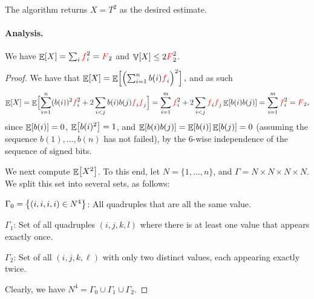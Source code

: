 The algorithm returns $X = T^2$ as the desired estimate.

\paragraph*{Analysis.}
\begin{lemma}
    We have $\mathop{\mathbb{E}}\!\left[ {X} \right] = \sum_i {\textcolor{red}{f}}_i^2 = {\textcolor{red}{F}}_2$ and
    $\mathop{\mathbb{V}}\!\left[ {X} \right] \leq 2 {\textcolor{red}{F}}_2^2$.
\end{lemma}
\begin{proof}
    We have that
    \begin{math}
        \Ex{X}
        =
        \Ex{\smash{ \Bigl(  \sum_{i=1}^n b(i) \frq_i \Bigr)^2}
           \Bigr.},%
    \end{math}
    and as such
    \begin{equation*}
        \Ex{X}%
        =%
        \Ex{\Bigr. \smash{  \sum_{i=1}^n (b(i))^2 \frq_i^2 %
              + 2\sum_{i < j} b(i) b(j) \frq_i \frq_j}}%
        =%
        \sum_{i=1}^m  \frq_i^2 +  2\sum_{i < j}  \frq_i \frq_j \Ex{   %
           b(i) b(j)}%
        =%
        \sum_{i=1}^m  \frq_i^2
        =%
        \Frq_2,
    \end{equation*}
    since $\mathop{\mathbb{E}}\!\left[ {b(i)} \right] = 0$, $\mathop{\mathbb{E}}\!\left[ {b(i)^2} \right] =1$, and
    $\mathop{\mathbb{E}}\!\left[ {b(i)b(j) } \right] = \mathop{\mathbb{E}}\!\left[ {b(i) } \right] \mathop{\mathbb{E}}\!\left[ {b(j)} \right] = 0$ (assuming the sequence
    $b(1), \ldots, b(n)$ has not failed), by the $6$-wise independence
    of the sequence of signed bits.

    \medskip%
    We next compute $\mathop{\mathbb{E}}\!\left[ {X^2} \right]$. To this end, let
    $N = \{1,\ldots, n\}$, and $\Gamma = N\times N \times N \times
    N$. We split this set into several sets, as follows:
    \begin{compactenumi}
        \smallskip%
        \item $\Gamma_0 = \left\{ {(i,i,i,i) \in N^4} \right\}$: All quadruples
        that are all the same value.

        \smallskip%
        \item $\Gamma_{1}$: Set of all quadruples $(i,j,k,l)$ where
        there is at least one value that appears exactly once.


        \smallskip%
        \item $\Gamma_{2}$: Set of all $(i,j,k,\ell)$ with only two
        distinct values, each appearing exactly twice.
    \end{compactenumi}
    \smallskip%
    Clearly, we have $N^4 = \Gamma_0 \cup \Gamma_1 \cup \Gamma_2$.

    \smallskip


\end{proof}
